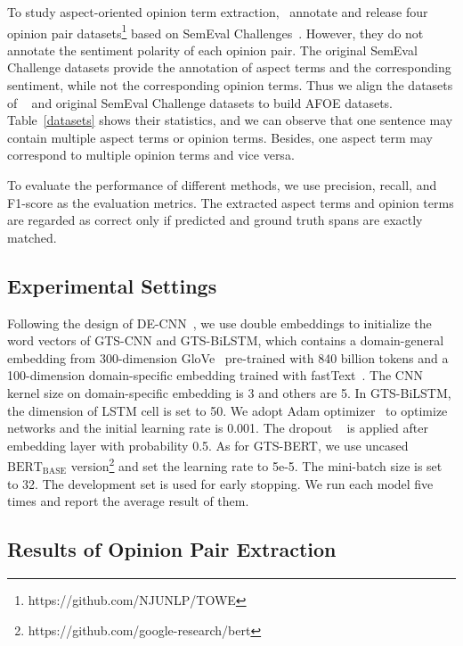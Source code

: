 \documentclass[11pt,a4paper]{article}
\begin{document}
To study aspect-oriented opinion term extraction,~ annotate and release four opinion pair datasets\footnote{https://github.com/NJUNLP/TOWE} based on SemEval Challenges~\cite{DBLP:conf/semeval/PontikiGPPAM14,DBLP:conf/semeval/PontikiGPMA15,DBLP:conf/semeval/PontikiGPAMAAZQ16}. However, they do not annotate the sentiment polarity of each opinion pair. The original SemEval Challenge datasets provide the annotation of aspect terms and the corresponding sentiment, while not the corresponding opinion terms. Thus we align the datasets of ~ and original SemEval Challenge datasets to build AFOE datasets. Table~\ref{datasets} shows their statistics, and we can observe that one sentence may contain multiple aspect terms or opinion terms. Besides, one aspect term may correspond to multiple opinion terms and vice versa.


To evaluate the performance of different methods, we use precision, recall, and F1-score as the evaluation metrics. The extracted aspect terms and opinion terms are regarded as correct only if predicted and ground truth spans are exactly matched.




\subsection{Experimental Settings}
Following the design of DE-CNN~\cite{DBLP:conf/acl/XuLSY18}, we use double embeddings to initialize the word vectors of GTS-CNN and GTS-BiLSTM, which contains a domain-general embedding from 300-dimension GloVe~\cite{DBLP:conf/emnlp/PenningtonSM14} pre-trained with 840 billion tokens and a 100-dimension domain-specific embedding trained with fastText~\cite{DBLP:journals/tacl/BojanowskiGJM17}. The CNN kernel size on domain-specific embedding is 3 and others are 5. In GTS-BiLSTM, the dimension of LSTM cell is set to 50. We adopt Adam optimizer~\cite{DBLP:journals/corr/KingmaB14} to optimize networks and the initial learning rate is 0.001. The dropout ~\cite{DBLP:journals/jmlr/SrivastavaHKSS14} is applied after embedding layer with probability 0.5. As for GTS-BERT, we use uncased $\text{BERT}_\text{BASE}$ version\footnote{https://github.com/google-research/bert} and set the learning rate to 5e-5. The mini-batch size is set to 32. The development set is used for early stopping. We run each model five times and report the average result of them.


\subsection{Results of Opinion Pair Extraction}
\end{document}

